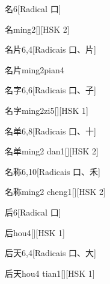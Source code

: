 \begin{entry}{名}{6}[Radical ⼝]
  \begin{phonetics}{名}{ming2}[][HSK 2]
  \end{phonetics}
\end{entry}

\begin{entry}{名片}{6,4}[Radicais ⼝、⽚]
  \begin{phonetics}{名片}{ming2pian4}
  \end{phonetics}
\end{entry}

\begin{entry}{名字}{6,6}[Radicais ⼝、⼦]
  \begin{phonetics}{名字}{ming2zi5}[][HSK 1]
  \end{phonetics}
\end{entry}

\begin{entry}{名单}{6,8}[Radicais ⼝、⼗]
  \begin{phonetics}{名单}{ming2 dan1}[][HSK 2]
  \end{phonetics}
\end{entry}

\begin{entry}{名称}{6,10}[Radicais ⼝、⽲]
  \begin{phonetics}{名称}{ming2 cheng1}[][HSK 2]
  \end{phonetics}
\end{entry}

\begin{entry}{后}{6}[Radical ⼝]
  \begin{phonetics}{后}{hou4}[][HSK 1]
  \end{phonetics}
\end{entry}

\begin{entry}{后天}{6,4}[Radicais ⼝、⼤]
  \begin{phonetics}{后天}{hou4 tian1}[][HSK 1]
  \end{phonetics}
\end{entry}

